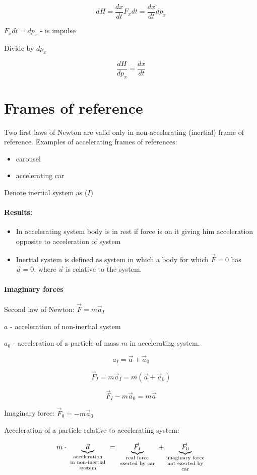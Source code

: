 $$dH = \frac{dx}{dt} F_x dt = \frac{dx}{dt} d p_x$$

$F_x dt = dp_x$ - is impulse

Divide by $dp_x$

$$\frac{dH}{dp_x} = \frac{dx}{dt}$$

\section{Frames of reference}

Two first laws of Newton are valid only in non-accelerating (inertial) frame of reference.
Examples of accelerating frames of references:
\begin{itemize}
	\item carousel
	\item accelerating car
\end{itemize} 

Denote inertial system as ($I$)

\paragraph{Results:}
\begin{itemize}
	\item In accelerating system body is in rest if force is on it giving him acceleration opposite to acceleration of system
	\item Inertial system is defined as system in which a body for which $\vec{F}=0$ has $\vec{a}=0$, where $\vec{a}$ is relative to the system.
\end{itemize} 

\paragraph{Imaginary forces}
Second law of Newton:
$\vec{F}=m\vec{a}_I$

$a$ - acceleration of non-inertial system 

$a_0$ - acceleration of a particle of mass $m$ in accelerating system.

$$a_I = \vec{a}+\vec{a}_0$$

$$\vec{F}_I = m \vec{a}_I = m(\vec{a}+\vec{a}_0) $$


$$\vec{F}_I - m\vec{a}_0  = m\vec{a} $$

Imaginary force: $\vec{F}_0 = -m \vec{a}_0$

Acceleration of a particle relative to accelerating system:

$$m \cdot \underbrace{\vec{a}}_{\parbox{2cm}{\scriptsize  \centering acceleration\\ in non-inertial system}} = \underbrace{\vec{F}_I}_{\parbox{2cm}{\scriptsize  \centering real force\\ exerted by car}} + \underbrace{\vec{F}_0}_{\parbox{2cm}{\scriptsize  \centering imaginary force\\ not exerted by car}}$$

